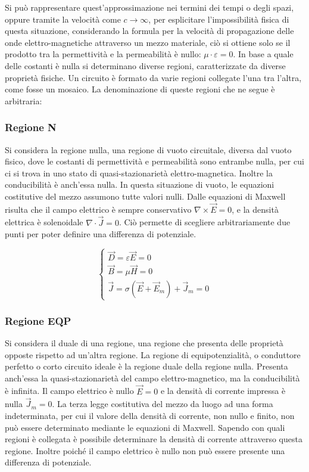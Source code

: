 \documentclass{article}
\numberwithin{equation}{subsection}
\begin{document}
Si può rappresentare quest'approssimazione 
nei termini dei tempi o degli spazi, oppure tramite la velocità come $c\to\infty$, per 
esplicitare l'impossibilità fisica di questa situazione, considerando la formula per la velocità di propagazione delle onde elettro-magnetiche attraverso un mezzo materiale, 
ciò si ottiene solo se il prodotto tra la permettività e la permeabilità è nullo: $\mu\cdot\varepsilon=0$. In base a quale delle costanti è nulla si determinano diverse 
regioni, caratterizzate da diverse proprietà fisiche. Un circuito è formato da varie regioni collegate l'una tra l'altra, come fosse un mosaico. 
La denominazione di queste regioni che ne segue è arbitraria:

\subsubsection{Regione N}
Si considera la regione nulla, una regione di vuoto circuitale, diversa dal vuoto fisico, dove le costanti di permettività e permeabilità sono entrambe nulla, per cui ci si 
trova in uno stato di quasi-stazionarietà elettro-magnetica. Inoltre la conducibilità è anch'essa nulla. In questa situazione di vuoto, le equazioni costitutive del mezzo 
assumono tutte valori nulli. Dalle equazioni di Maxwell risulta che il campo elettrico è sempre conservativo $\nabla\times\vec{E}=0$, e la densità elettrica è solenoidale $\nabla\cdot\vec{J}=0$. 
Ciò permette di scegliere arbitrariamente due punti per poter definire una differenza di potenziale. 

\begin{equation*}
    \begin{cases}
        \vec{D}=\varepsilon\vec{E}=0\\
        \vec{B}=\mu\vec{H}=0\\
        \vec{J}=\sigma(\vec{E}+\vec{E}_m)+\vec{J}_m=0
    \end{cases}
\end{equation*}

\subsubsection{Regione EQP}
Si considera il duale di una regione, una regione che presenta delle proprietà opposte rispetto ad un'altra regione. La regione di equipotenzialità, o conduttore perfetto o 
corto circuito ideale è la regione duale della regione nulla. Presenta anch'essa la quasi-stazionarietà del campo elettro-magnetico, ma la conducibilità è infinita. Il campo 
elettrico è nullo $\vec{E}=0$ e la densità di corrente impressa è nulla $\vec{J}_m=0$. La terza legge costitutiva del mezzo da 
luogo ad una forma indeterminata, per cui il valore della densità di corrente, non nullo e finito, non può essere determinato mediante le equazioni di Maxwell. Sapendo con 
quali regioni è collegata è possibile determinare la densità di corrente attraverso questa regione. Inoltre poiché il campo elettrico è nullo non può essere presente 
una differenza di potenziale. 
\end{document}
